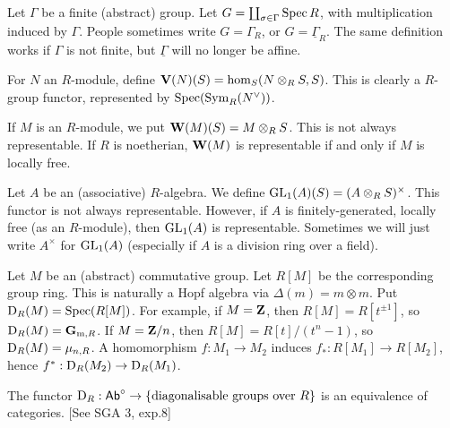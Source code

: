 \documentclass{article}
\begin{document}
\begin{example}
Let $\Gamma$ be a finite (abstract) group. Let 
$G=\coprod_{\sigma\in \Gamma}\operatorname{Spec} R$, with multiplication induced by 
$\Gamma$. People sometimes write $G=\Gamma_R$, or $G=\underline\Gamma_R$. The 
same definition works if $\Gamma$ is not finite, but $\underline\Gamma$ will no 
longer be affine. 
\end{example}

\begin{example}
For $N$ an $R$-module, define $\mathbf{V}(N)(S)=\hom_S(N\otimes_R S,S)$. This is 
clearly a $R$-group functor, represented by 
$\operatorname{Spec}(\operatorname{Sym}_R(N^\vee))$. 
\end{example}

\begin{example}
If $M$ is an $R$-module, we put $\mathbf{W}(M)(S)=M\otimes_R S$. This is not always 
representable. If $R$ is noetherian, $\mathbf{W}(M)$ is representable if and only if 
$M$ is locally free. 
\end{example}

\begin{example}
Let $A$ be an (associative) $R$-algebra. We define 
$\operatorname{GL}_1(A)(S) = (A\otimes_R S)^\times$. This functor is not always 
representable. However, if $A$ is finitely-generated, locally free (as an 
$R$-module), then $\operatorname{GL}_1(A)$ is representable. Sometimes we will 
just write $A^\times$ for $\operatorname{GL}_1(A)$ (especially if $A$ is a 
division ring over a field). 
\end{example}

\begin{example}
Let $M$ be an (abstract) commutative group. Let $R[M]$ be the corresponding 
group ring. This is naturally a Hopf algebra via 
$\Delta(m)=m\otimes m$. Put
$\operatorname{D}_R(M)=\operatorname{Spec}(R[M])$. For example, if $M=\mathbf{Z}$, then 
$R[M]=R[t^{\pm 1}]$, so $\operatorname{D}_R(M)=\mathbf{G}_{\mathrm{m}, R}$. If 
$M=\mathbf{Z}/n$, then $R[M]=R[t]/(t^n-1)$, so 
$\operatorname{D}_R(M)=\mu_{n,R}$. A homomorphism 
$f:M_1 \to M_2$ induces $f_\ast:R[M_1] \to R[M_2]$, hence 
$f^\ast:\operatorname{D}_R(M_2) \to \operatorname{D}_R(M_1)$. 
\end{example}

\begin{exercise}
The functor 
$\operatorname{D}_R:\mathsf{Ab}^\circ \to \{\text{diagonalisable groups over }R\}$ is 
an equivalence of categories. [See SGA 3, exp.8]
\end{exercise}
\end{document}
